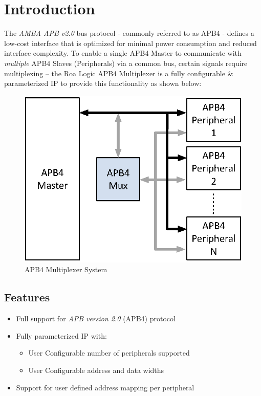 \chapter{Introduction}\label{introduction}

The \emph{AMBA APB v2.0} bus protocol - commonly referred to as APB4 - 
defines a low-cost interface that is optimized for minimal power
consumption and reduced interface complexity. To enable a single APB4
Master to communicate with \emph{multiple} APB4 Slaves (Peripherals) via
a common bus, certain signals require multiplexing -- the Roa Logic APB4
Multiplexer is a fully configurable \& parameterized IP to provide this
functionality as shown below:

\begin{figure}[th]
	\centering
	\includegraphics{assets/img/APB4-Mux-Sys}
	\caption{APB4 Multiplexer System}
	\label{fig:apb4-mux-sys}
\end{figure}

\section{Features}\label{features}

\begin{itemize}
\item
  Full support for \emph{APB version 2.0} (APB4) protocol
\item
  Fully parameterized IP with:
  \begin{itemize}
  \item
    User Configurable number of peripherals supported
  \item
    User Configurable address and data widths
  \end{itemize}
\item
  Support for user defined address mapping per peripheral
\end{itemize}